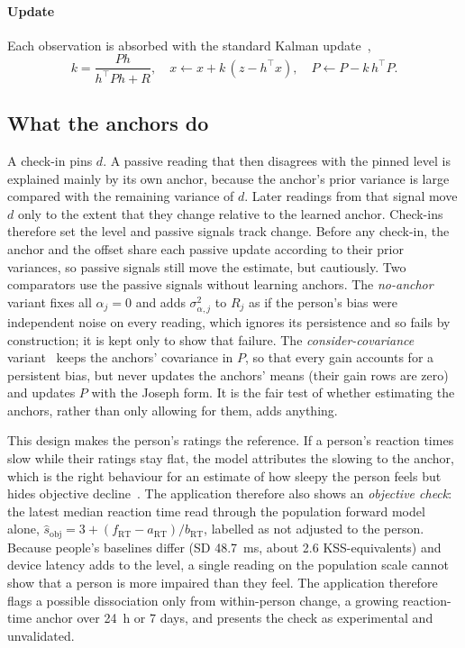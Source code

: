 \paragraph*{Update} Each observation is absorbed with the standard Kalman update~\cite{kalman1960new},
\begin{equation}
  k = \frac{P h}{h^\top P h + R}, \quad x \leftarrow x + k\,(z - h^\top x), \quad P \leftarrow P - k\,h^\top P.
  \label{eq:kf}
\end{equation}

\subsection{What the anchors do}
A check-in pins $d$. A passive reading that then disagrees with the pinned level is explained mainly by its own anchor, because the anchor's prior variance is large compared with the remaining variance of $d$. Later readings from that signal move $d$ only to the extent that they change relative to the learned anchor. Check-ins therefore set the level and passive signals track change. Before any check-in, the anchor and the offset share each passive update according to their prior variances, so passive signals still move the estimate, but cautiously. Two comparators use the passive signals without learning anchors. The \emph{no-anchor} variant fixes all $\alpha_j = 0$ and adds $\sigma_{\alpha,j}^2$ to $R_j$ as if the person's bias were independent noise on every reading, which ignores its persistence and so fails by construction; it is kept only to show that failure. The \emph{consider-covariance} variant~\cite{schmidt1966application} keeps the anchors' covariance in $P$, so that every gain accounts for a persistent bias, but never updates the anchors' means (their gain rows are zero) and updates $P$ with the Joseph form. It is the fair test of whether estimating the anchors, rather than only allowing for them, adds anything.

This design makes the person's ratings the reference. If a person's reaction times slow while their ratings stay flat, the model attributes the slowing to the anchor, which is the right behaviour for an estimate of how sleepy the person feels but hides objective decline~\cite{vandongen2003cumulative,leproult2003individual}. The application therefore also shows an \emph{objective check}: the latest median reaction time read through the population forward model alone, $\hat s_{\mathrm{obj}} = 3 + (f_{\mathrm{RT}} - a_{\mathrm{RT}})/b_{\mathrm{RT}}$, labelled as not adjusted to the person. Because people's baselines differ (SD 48.7~ms, about 2.6 KSS-equivalents) and device latency adds to the level, a single reading on the population scale cannot show that a person is more impaired than they feel. The application therefore flags a possible dissociation only from within-person change, a growing reaction-time anchor over 24~h or 7 days, and presents the check as experimental and unvalidated.

